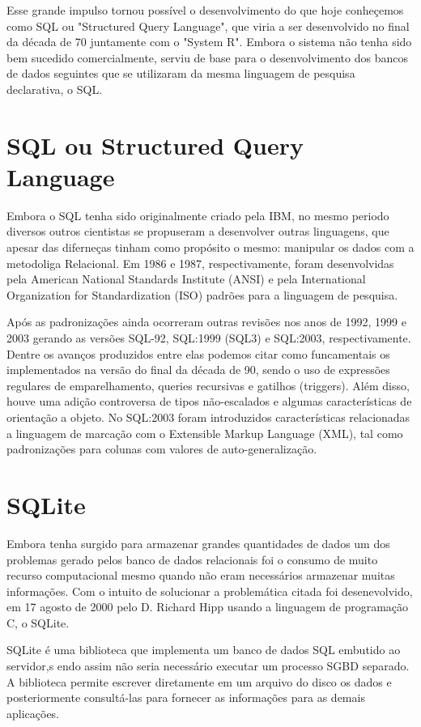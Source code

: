 \documentclass[12pt]{article}
\begin{document}
Esse grande impulso tornou possível o desenvolvimento do que hoje conheçemos como SQL ou "Structured Query Language", que viria a ser desenvolvido no final da década de 70 juntamente com o "System R". Embora o sistema não tenha sido bem sucedido comercialmente, serviu de base para o desenvolvimento dos bancos de dados seguintes que se utilizaram da mesma linguagem de pesquisa declarativa, o SQL.

\section{SQL ou Structured Query Language}

Embora o SQL tenha sido originalmente criado pela IBM, no mesmo periodo diversos outros cientistas se propuseram a desenvolver outras linguagens, que apesar das diferneças tinham como propósito o mesmo: manipular os dados com a metodoliga Relacional. Em 1986 e 1987, respectivamente, foram desenvolvidas pela American National Standards Institute (ANSI) e pela International Organization for Standardization (ISO) padrões para a linguagem de pesquisa.

Após as padronizações ainda ocorreram outras revisões nos anos de 1992, 1999 e 2003 gerando as versões SQL-92, SQL:1999 (SQL3) e SQL:2003, respectivamente. Dentre os avanços produzidos entre elas podemos citar como funcamentais os implementados na versão do final da década de 90, sendo o uso de expressões regulares de emparelhamento, queries recursivas e gatilhos (triggers). Além disso, houve uma adição controversa de tipos não-escalados e algumas características de orientação a objeto. No SQL:2003 foram introduzidos características relacionadas a linguagem de marcação com o Extensible Markup Language (XML), tal como padronizações para colunas com valores de auto-generalização.

\section{SQLite}

Embora tenha surgido para armazenar grandes quantidades de dados um dos problemas gerado pelos banco de dados relacionais foi o consumo de muito recurso computacional mesmo quando não eram necessários armazenar muitas informações. Com o intuito de solucionar a problemática citada foi desenevolvido, em 17 agosto de 2000 pelo D. Richard Hipp usando a linguagem de programação C, o SQLite.

SQLite é uma biblioteca que implementa um banco de dados SQL embutido ao servidor,s endo assim não seria necessário executar um processo SGBD separado. A biblioteca permite escrever diretamente em um arquivo do disco os dados e posteriormente consultá-las para fornecer as informações para as demais aplicações.
\end{document}
